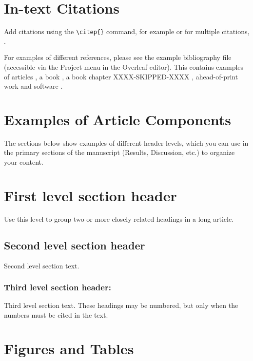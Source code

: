 \documentclass[9pt,twocolumn,twoside]{g3_article/gsag3jnl}
\begin{document}
{\section*{In-text Citations}

Add citations using the \verb|\citep{}| command, for example \citep{neher2013genealogies} or for multiple citations, \citep{neher2013genealogies, rodelsperger2014characterization}.

For examples of different references, please see the example bibliography file 
(accessible via the Project menu in the Overleaf editor). This contains examples 
of articles \citep{neher2013genealogies, rodelsperger2014characterization}, a 
book \citep{Sturtevent2001}, a book 
chapter 
XXXX-SKIPPED-XXXX
, ahead-of-print work \citep{Starita2015} and software \citep{Kruijer2015}.

\section*{Examples of Article Components}
\label{sec:examples}

The sections below show examples of different header levels, which you can use in the primary sections of the manuscript (Results, Discussion, etc.) to organize your content.

\section*{First level section header}

Use this level to group two or more closely related headings in a long article.

\subsection*{Second level section header}

Second level section text.

\subsubsection*{Third level section header:}

Third level section text. These headings may be numbered, but only when the numbers must be cited in the text. 

\section*{Figures and Tables}

}
\end{document}
